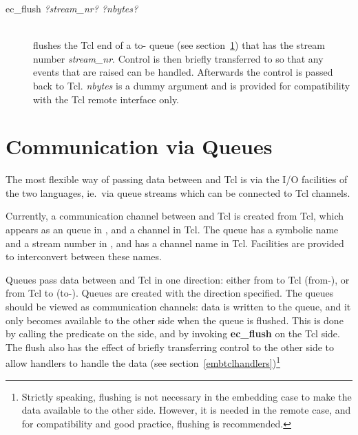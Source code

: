 \begin{description}
\item[ec_flush {\it ?stream_nr?
	?nbytes?}]\ \\
        flushes the Tcl end of a to-{\eclipse} queue (see
        section~\ref{tclembedqueues}) that has the
        {\eclipse} stream number {\it stream_nr}. Control is then
        briefly transferred to {\eclipse} so that any events that are raised
        can be handled. Afterwards the control is passed back to Tcl.
        {\it nbytes\/} is a dummy argument
        and is provided for compatibility with the Tcl remote interface
        only.

\end{description}


\section{Communication via Queues}
\label{tclembedqueues}

\label{ecqueueconnect}
The most flexible way of passing data between {\eclipse} and Tcl is
via the I/O facilities of the two languages,
ie.\ via {\eclipse} queue streams which can be connected to Tcl channels.

Currently, a communication channel between {\eclipse} and Tcl is created
from Tcl, which appears as an {\eclipse} queue in {\eclipse}, and a channel
in Tcl. The queue has a symbolic name and a stream number in {\eclipse},
and has a channel name in Tcl. Facilities are provided to interconvert
between these names. 

Queues pass data between {\eclipse} and Tcl in one direction: either from
{\eclipse} to Tcl (from-{\eclipse}), or from Tcl to {\eclipse}
(to-{\eclipse}). Queues are created with the direction specified. The
queues should be viewed as communication channels: data is written to the
queue, and it only becomes available to the other side when the queue is
flushed. This is done by calling the predicate  on the
{\eclipse} side, and by invoking {\bf ec_flush} on the Tcl side. The flush
also has the effect of briefly transferring control to the other side to
allow handlers to handle the data (see
section~\ref{embtclhandlers})\footnote{Strictly speaking, flushing is not
necessary in the embedding case to make the data available to the other
side. However, it is needed in the remote case, and for compatibility and
good practice, flushing is recommended.}


